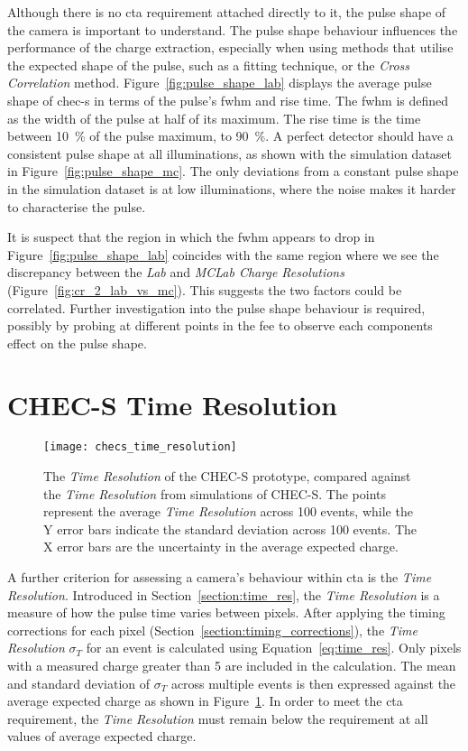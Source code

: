 Although there is no \gls{cta} requirement attached directly to it, the pulse shape of the camera is important to understand. The pulse shape behaviour influences the performance of the charge extraction, especially when using methods that utilise the expected shape of the pulse, such as a fitting technique, or the \textit{Cross Correlation} method. Figure~\ref{fig:pulse_shape_lab} displays the average pulse shape of \gls{chec-s} in terms of the pulse's \gls{fwhm} and rise time. The \gls{fwhm} is defined as the width of the pulse at half of its maximum. The rise time is the time between \SI{10}{\percent} of the pulse maximum, to \SI{90}{\percent}. A perfect detector should have a consistent pulse shape at all illuminations, as shown with the simulation dataset in Figure~\ref{fig:pulse_shape_mc}. The only deviations from a constant pulse shape in the simulation dataset is at low illuminations, where the noise makes it harder to characterise the pulse. 

It is suspect that the region in which the \gls{fwhm} appears to drop in Figure~\ref{fig:pulse_shape_lab} coincides with the same region where we see the discrepancy between the \textit{Lab} and \textit{MCLab Charge Resolutions} (Figure~\ref{fig:cr_2_lab_vs_mc}). This suggests the two factors could be correlated. Further investigation into the pulse shape behaviour is required, possibly by probing at different points in the \gls{fee} to observe each components effect on the pulse shape. 

\section{CHEC-S Time Resolution}

\begin{figure}
	\centering
    \texttt{[image: checs\_time\_resolution]} 
	\caption[CHEC-S \textit{Time Resolution}.]{The \textit{Time Resolution} of the CHEC-S prototype, compared against the \textit{Time Resolution} from simulations of CHEC-S. The points represent the average \textit{Time Resolution} across 100 events, while the Y error bars indicate the standard deviation across 100 events. The X error bars are the uncertainty in the average expected charge.}
	\label{fig:checs_time_resolution}
\end{figure}

A further criterion for assessing a camera's behaviour within \gls{cta} is the \textit{Time Resolution}. Introduced in Section~\ref{section:time_res}, the \textit{Time Resolution} is a measure of how the pulse time varies between pixels. After applying the timing corrections for each pixel (Section~\ref{section:timing_corrections}), the \textit{Time Resolution} $\sigma_T$ for an event is calculated using Equation~\ref{eq:time_res}. Only pixels with a measured charge greater than \SI{5}{\pe} are included in the calculation. The mean and standard deviation of $\sigma_T$ across multiple events is then expressed against the average expected charge as shown in Figure~\ref{fig:checs_time_resolution}. In order to meet the \gls{cta} requirement, the \textit{Time Resolution} must remain below the requirement at all values of average expected charge.

